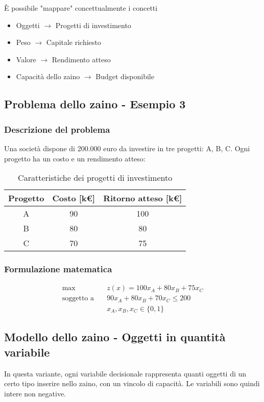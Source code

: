 È possibile "mappare" concettualmente i concetti
\begin{itemize}
    \item Oggetti $\rightarrow$ Progetti di investimento
    \item Peso $\rightarrow$ Capitale richiesto
    \item Valore $\rightarrow$ Rendimento atteso
    \item Capacità dello zaino $\rightarrow$ Budget disponibile
\end{itemize}

\subsection{Problema dello zaino - Esempio 3}
\subsubsection{Descrizione del problema}
Una società dispone di 200.000 euro da investire in tre progetti: A, B, C. 
Ogni progetto ha un costo e un rendimento atteso:

\begin{table}[htbp]
    \centering
    \caption{Caratteristiche dei progetti di investimento}
    \begin{tabular}{|c|c|c|}
        \hline
        \textbf{Progetto} & \textbf{Costo [k€]} & \textbf{Ritorno atteso [k€]} \\
        \hline
        A & 90 & 100 \\
        B & 80 & 80 \\
        C & 70 & 75 \\
        \hline
    \end{tabular}
\end{table}

\subsubsection{Formulazione matematica}

\[
\begin{aligned}
\max \quad & z(x) = 100x_A + 80x_B + 75x_C \\
\text{soggetto a} \quad & 90x_A + 80x_B + 70x_C \leq 200 \\
& x_A, x_B, x_C \in \{0, 1\}
\end{aligned}
\]

\subsection{Modello dello zaino - Oggetti in quantità variabile}
In questa variante, ogni variabile decisionale rappresenta quanti oggetti 
di un certo tipo inserire nello zaino, con un vincolo di capacità.
Le variabili sono quindi intere non negative.

